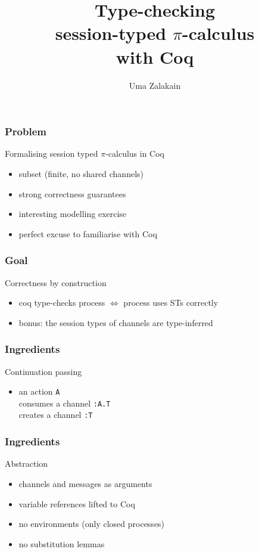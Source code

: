 \documentclass{beamer}
\title{
    Type-checking \\
    session-typed $\pi$-calculus \\
    with Coq\\
}
\author{Uma Zalakain}
\institute{University of Glasgow}
\date{}
\begin{document}
\begin{frame}
    \titlepage
\end{frame}

\begin{frame}
    \frametitle{Problem}
    \begin{block}{Formalising session typed $\pi$-calculus in Coq}
        \begin{itemize}
            \item subset (finite, no shared channels)
            \item strong correctness guarantees
            \item interesting modelling exercise
            \item perfect excuse to familiarise with Coq
        \end{itemize}
    \end{block}
\end{frame}

\begin{frame}
    \frametitle{Goal}
    \begin{block}{Correctness by construction}
        \begin{itemize}
            \item coq type-checks process $\iff$ process uses STs correctly
            \item bonus: the session types of channels are type-inferred
        \end{itemize}
    \end{block}
\end{frame}

\begin{frame}
    \frametitle{Ingredients}
    \begin{block}{Continuation passing}
        \begin{itemize}
            \item an action \texttt{A}\\
                consumes a channel \texttt{:A.T}\\
                creates a channel \texttt{:T}
        \end{itemize}
    \end{block}
\end{frame}

\begin{frame}
    \frametitle{Ingredients}
    \begin{block}{Abstraction}
        \begin{itemize}
            \item channels and messages as arguments
            \item variable references lifted to Coq
            \item no environments (only closed processes)
            \item no substitution lemmas
        \end{itemize}
    \end{block}
\end{frame}
\end{document}
